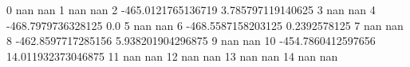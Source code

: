 0 nan nan
1 nan nan
2 -465.0121765136719 3.785797119140625
3 nan nan
4 -468.7979736328125 0.0
5 nan nan
6 -468.5587158203125 0.2392578125
7 nan nan
8 -462.8597717285156 5.938201904296875
9 nan nan
10 -454.7860412597656 14.011932373046875
11 nan nan
12 nan nan
13 nan nan
14 nan nan
